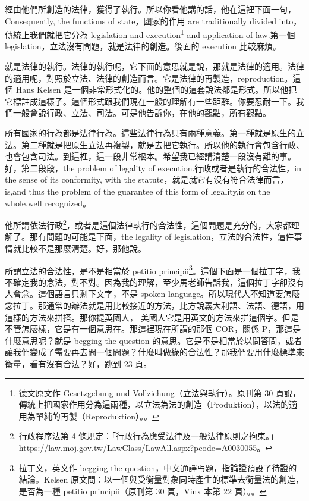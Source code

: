 \hypertarget{w05:cue:46}{}經由他們所創造的法律，獲得了執行。所以你看他講的話，他在這裡下面一句，Consequently, the functions of state，國家的作用 are traditionally divided into，傳統上我們就把它分為 legislation and execution\footnote{德文原文作 Gesetzgebung und Vollziehung（立法與執行）。原刊第 30 頁說，傳統上把國家作用分為這兩種，以立法為法的創造（Produktion），以法的適用為單純的再製（Reproduktion）。\cite[30]{kelsen1929}。} and application of law.第一個 legislation，立法沒有問題，就是法律的創造。後面的 execution 比較麻煩。

\hypertarget{w05:cue:47}{}就是法律的執行。法律的執行呢，它下面的意思就是說，那就是法律的適用。法律的適用呢，對照於立法、法律的創造而言。它是法律的再製造，reproduction。這個 Hans Kelsen 是一個非常形式化的。他的整個的這套說法都是形式。所以他把它標註成這樣子。這個形式跟我們現在一般的理解有一些距離。你要忍耐一下。我們一般會說行政、立法、司法。可是他告訴你，在他的觀點，所有觀點。

\hypertarget{w05:cue:48}{}所有國家的行為都是法律行為。這些法律行為只有兩種意義。第一種就是原生的立法。第二種就是把原生立法再複製，就是去把它執行。所以他的執行會包含行政、也會包含司法。到這裡，這一段非常根本。希望我已經講清楚一段沒有難的事。好，第二段段，the problem of legality of execution.行政或者是執行的合法性，in the sense of its conformity,
\hypertarget{w05:cue:49}{}with the statute，就是就它有沒有符合法律而言，is,and thus the problem of the guarantee of this form of legality,is on the whole,well recognized。

\hypertarget{w05:cue:50}{}他所謂依法行政\footnote{行政程序法第 4 條規定：「行政行為應受法律及一般法律原則之拘束。」\url{https://law.moj.gov.tw/LawClass/LawAll.aspx?pcode=A0030055}。}，或者是這個法律執行的合法性，這個問題是充分的，大家都理解了。那有問題的可能是下面，the legality of legislation，立法的合法性，這件事情就比較不是那麼清楚。好，那他說。

\hypertarget{w05:cue:51}{}所謂立法的合法性，是不是相當於 petitio principii\footnote{拉丁文，英文作 begging the question，中文通譯丐題，指論證預設了待證的結論。Kelsen 原文問：以一個與受衡量對象同時產生的標準去衡量法的創造，是否為一種 petitio principii（原刊第 30 頁，Vinx 本第 22 頁）。\cite[30]{kelsen1929}。}。這個下面是一個拉丁字，我不確定我的念法，對不對。因為我的理解，至少馬老師告訴我，這個拉丁字卻沒有人會念。這個語言只剩下文字，不是 spoken language。所以現代人不知道要怎麼念拉丁。那通常的辦法就是用比較接近的方法，比方說義大利語、法語、德語，用這樣的方法來拼搭。那你提英國人，
\hypertarget{w05:cue:52}{}美國人它是用英文的方法來拼這個字。但是不管怎麼樣，它是有一個意思在。那這裡現在所謂的那個 COR，關係 P，那這是什麼意思呢？就是 begging the question 的意思。它是不是相當於以問答問，或者讓我們變成了需要再去問一個問題？什麼叫做綠的合法性？那我們要用什麼標準來衡量，看有沒有合法？好，跳到 23 頁。

